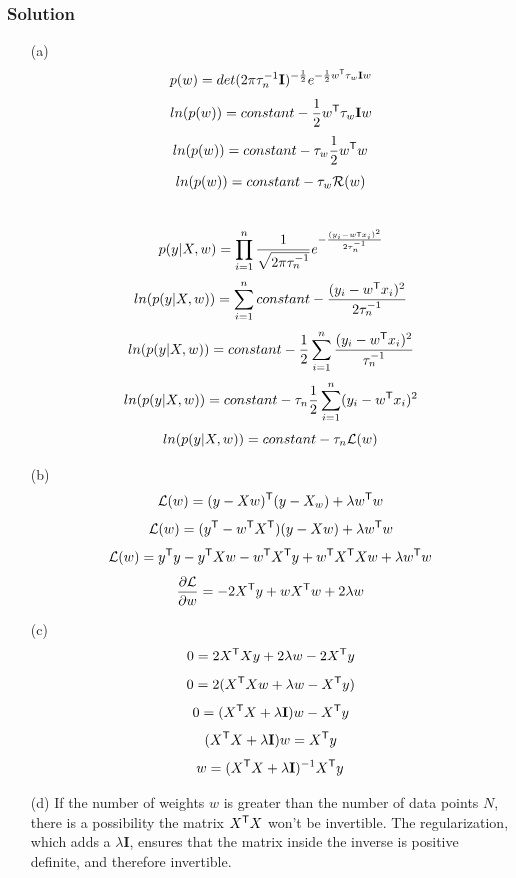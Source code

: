 \documentclass[submit]{harvardml}
\begin{document}
\subsubsection*{Solution}
\begin{itemize}
\item[(a)]
    $$p(w) = det(2\pi\tau_n^{-1}\mathbf{I})^{-\frac{1}{2}}e^{-\frac{1}{2}w^{\mathsf{T}}\tau_w\mathbf{I}w}$$
    $$ln(p(w)) = constant - \frac{1}{2}w^{\mathsf{T}}\tau_w\mathbf{I}w$$
    $$ln(p(w)) = constant - \tau_w\frac{1}{2}w^{\mathsf{T}}w$$
    $$ln(p(w)) = constant - \tau_w\mathcal{R}(w)$$
    \\
    $$p(y|X,w) = \prod_{i=1}^{n}\frac{1}{\sqrt{2\pi\tau_n^{-1}}}e^{-\frac{(y_i-w{\mathsf{T}}x_i)^2}{2\tau_n^{-1}}}$$
    $$ln(p(y|X,w)) = \sum_{i=1}^{n}constant - \frac{(y_i-w^{\mathsf{T}}x_i)^2}{2\tau_n^{-1}}$$
    $$ln(p(y|X,w)) = constant - \frac{1}{2}\sum_{i=1}^n\frac{(y_i-w^{\mathsf{T}}x_i)^2}{\tau_n^{-1}}$$
    $$ln(p(y|X,w)) = constant - \tau_n\frac{1}{2}\sum_{i=1}^n(y_i-w^{\mathsf{T}}x_i)^2$$
    $$ln(p(y|X,w)) = constant - \tau_n\mathcal{L}(w)$$

\item[(b)]
    $$\mathcal{L}(w) = (y-Xw)^{\mathsf{T}}(y-X_w) + \lambda w^{\mathsf{T}}w$$
    $$\mathcal{L}(w) = (y^{\mathsf{T}}-w^{\mathsf{T}}X^{\mathsf{T}})(y-Xw) + \lambda w^{\mathsf{T}}w$$
    $$\mathcal{L}(w) = y^{\mathsf{T}}y - y^{\mathsf{T}}Xw - w^{\mathsf{T}}X^{\mathsf{T}}y + w^{\mathsf{T}}X^{\mathsf{T}}Xw + \lambda w^{\mathsf{T}}w$$
    $$\frac{\partial \mathcal{L}}{\partial w} = -2X^{\mathsf{T}}y + wX^{\mathsf{T}}w + 2 \lambda w$$

\item[(c)]
    $$0 = 2X^{\mathsf{T}}Xy + 2\lambda w - 2X^{\mathsf{T}}y$$
    $$0 = 2(X^{\mathsf{T}}Xw + \lambda w - X^{\mathsf{T}}y)$$
    $$0 = (X^{\mathsf{T}}X + \lambda \mathbf{I})w - X^{\mathsf{T}}y$$
    $$(X^{\mathsf{T}}X + \lambda \mathbf{I})w = X^{\mathsf{T}}y$$
    $$w = (X^{\mathsf{T}}X + \lambda \mathbf{I})^{-1}X^{\mathsf{T}}y$$

\item[(d)]
    If the number of weights $w$ is greater than the number of data points $N$,
    there is a possibility the matrix $X^{\mathsf{T}}X$ won't be invertible. The
    regularization, which adds a $\lambda\mathbf{I}$, ensures that the matrix
    inside the inverse is positive definite, and therefore invertible.
\end{itemize}



\newpage
\end{document}
